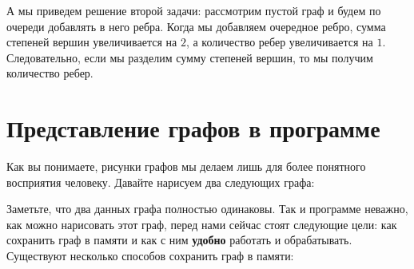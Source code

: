 \documentclass{article}
\begin{document}
А мы приведем решение второй задачи: рассмотрим пустой граф и будем по очереди добавлять в него ребра. Когда мы добавляем очередное ребро, сумма степеней вершин увеличивается на $2$, а количество ребер увеличивается на $1$. Следовательно, если мы разделим сумму степеней вершин, то мы получим количество ребер. 

\section{Представление графов в программе}

Как вы понимаете, рисунки графов мы делаем лишь для более понятного восприятия человеку. Давайте нарисуем два следующих графа:

\begin{center}
\end{center}

\begin{center}
\end{center}

Заметьте, что два данных графа полностью одинаковы. Так и программе неважно, как можно нарисовать этот граф, перед нами сейчас стоят следующие цели: как сохранить граф в памяти и как с ним \textbf{удобно} работать и обрабатывать. 
Существуют несколько способов сохранить граф в памяти:
\end{document}
